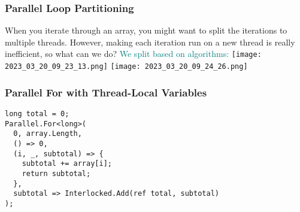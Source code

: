 \documentclass[main.tex,fontsize=8pt,paper=a4,paper=portrait,DIV=calc,]{scrartcl}
\begin{document}
\subsubsection{Parallel Loop Partitioning}
When you iterate through an array, you might want to split the iterations to multiple threads.\newline
However, making each iteration run on a new thread is really inefficient, so what can we do?\newline
\textcolor{teal}{We split based on algorithms:}\newline
\texttt{[image: 2023\_03\_20\_09\_23\_13.png]}\newline
\texttt{[image: 2023\_03\_20\_09\_24\_26.png]}\newline

\subsubsection{Parallel For with Thread-Local Variables}
\begin{lstlisting}
long total = 0;
Parallel.For<long>(
  0, array.Length,
  () => 0,
  (i, _, subtotal) => {
    subtotal += array[i];
    return subtotal;
  },
  subtotal => Interlocked.Add(ref total, subtotal)
);
\end{lstlisting}
\end{document}
